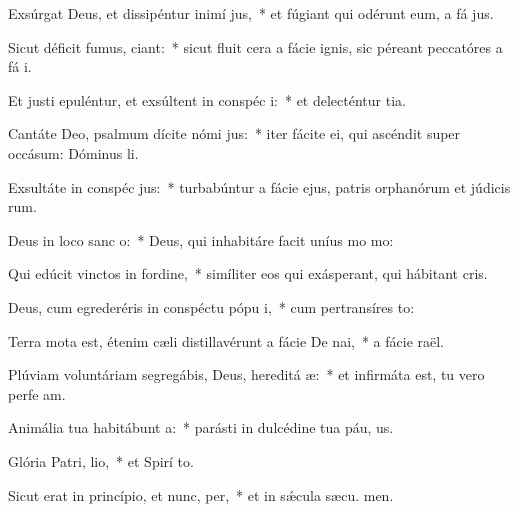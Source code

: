 \item Exsúrgat Deus, et dissipéntur inimí jus,~* et fúgiant qui odérunt eum, a fá jus.
\item Sicut déficit fumus, ciant:~* sicut fluit cera a fácie ignis, sic péreant peccatóres a fá i.
\item Et justi epuléntur, et exsúltent in conspéc i:~* et delecténtur  tia.
\item Cantáte Deo, psalmum dícite nómi jus:~* iter fácite ei, qui ascéndit super occásum: Dóminus  li.
\item Exsultáte in conspéc jus:~* turbabúntur a fácie ejus, patris orphanórum et júdicis rum.
\item Deus in loco sanc o:~* Deus, qui inhabitáre facit uníus mo  mo:
\item Qui edúcit vinctos in fordine,~* simíliter eos qui exásperant, qui hábitant  cris.
\item Deus, cum egrederéris in conspéctu pópu i,~* cum pertransíres  to:
\item Terra mota est, étenim cæli distillavérunt a fácie De nai,~* a fácie  raël.
\item Plúviam voluntáriam segregábis, Deus, hereditá æ:~* et infirmáta est, tu vero perfe am.
\item Animália tua habitábunt  a:~* parásti in dulcédine tua páu, us.
\item Glória Patri,  lio,~* et Spirí to.
\item Sicut erat in princípio, et nunc,  per,~* et in sǽcula sæcu. men.
